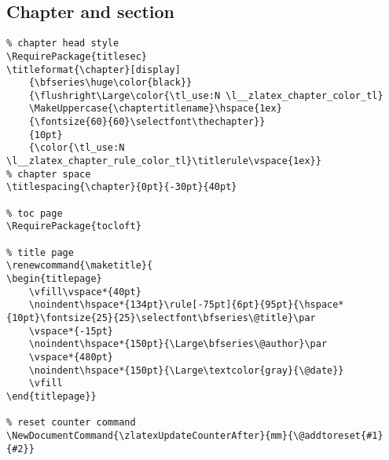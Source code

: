 \subsection{Chapter and section}
\begin{verbatim}
% chapter head style
\RequirePackage{titlesec}
\titleformat{\chapter}[display]
    {\bfseries\huge\color{black}}
    {\flushright\Large\color{\tl_use:N \l__zlatex_chapter_color_tl}
    \MakeUppercase{\chaptertitlename}\hspace{1ex}
    {\fontsize{60}{60}\selectfont\thechapter}}
    {10pt}
    {\color{\tl_use:N \l__zlatex_chapter_rule_color_tl}\titlerule\vspace{1ex}}
% chapter space
\titlespacing{\chapter}{0pt}{-30pt}{40pt}

% toc page
\RequirePackage{tocloft}

% title page
\renewcommand{\maketitle}{
\begin{titlepage}
    \vfill\vspace*{40pt}
    \noindent\hspace*{134pt}\rule[-75pt]{6pt}{95pt}{\hspace*{10pt}\fontsize{25}{25}\selectfont\bfseries\@title}\par
    \vspace*{-15pt}
    \noindent\hspace*{150pt}{\Large\bfseries\@author}\par
    \vspace*{480pt}
    \noindent\hspace*{150pt}{\Large\textcolor{gray}{\@date}}
    \vfill
\end{titlepage}} 

% reset counter command
\NewDocumentCommand{\zlatexUpdateCounterAfter}{mm}{\@addtoreset{#1}{#2}}
\end{verbatim}